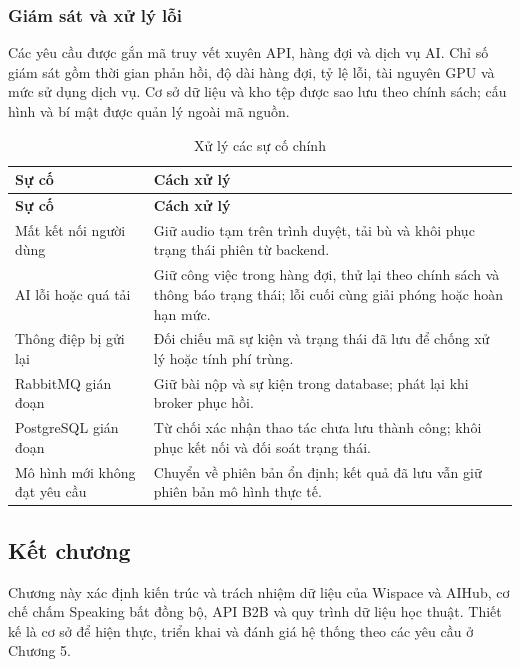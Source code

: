 \subsubsection{Giám sát và xử lý lỗi}

Các yêu cầu được gắn mã truy vết xuyên API, hàng đợi và dịch vụ AI. Chỉ số giám sát gồm thời gian phản hồi, độ dài hàng đợi, tỷ lệ lỗi, tài nguyên GPU và mức sử dụng dịch vụ. Cơ sở dữ liệu và kho tệp được sao lưu theo chính sách; cấu hình và bí mật được quản lý ngoài mã nguồn.

\begingroup\small{}

\begin{longtable}{|>{\raggedright\arraybackslash}p{}|>{\raggedright\arraybackslash}p{}|}

\caption{Xử lý các sự cố chính}\label{design:tab:7}\\\hline

\textbf{Sự cố} & \textbf{Cách xử lý} \\ \hline

\endfirsthead

\hline

\textbf{Sự cố} & \textbf{Cách xử lý} \\ \hline

\endhead

Mất kết nối người dùng & Giữ audio tạm trên trình duyệt, tải bù và khôi phục trạng thái phiên từ backend. \\ \hline

AI lỗi hoặc quá tải & Giữ công việc trong hàng đợi, thử lại theo chính sách và thông báo trạng thái; lỗi cuối cùng giải phóng hoặc hoàn hạn mức. \\ \hline

Thông điệp bị gửi lại & Đối chiếu mã sự kiện và trạng thái đã lưu để chống xử lý hoặc tính phí trùng. \\ \hline

RabbitMQ gián đoạn & Giữ bài nộp và sự kiện trong database; phát lại khi broker phục hồi. \\ \hline

PostgreSQL gián đoạn & Từ chối xác nhận thao tác chưa lưu thành công; khôi phục kết nối và đối soát trạng thái. \\ \hline

Mô hình mới không đạt yêu cầu & Chuyển về phiên bản ổn định; kết quả đã lưu vẫn giữ phiên bản mô hình thực tế. \\ \hline

\end{longtable}

\endgroup

\subsection{Kết chương}

Chương này xác định kiến trúc và trách nhiệm dữ liệu của Wispace và AIHub, cơ chế chấm Speaking bất đồng bộ, API B2B và quy trình dữ liệu học thuật. Thiết kế là cơ sở để hiện thực, triển khai và đánh giá hệ thống theo các yêu cầu ở Chương 5.
